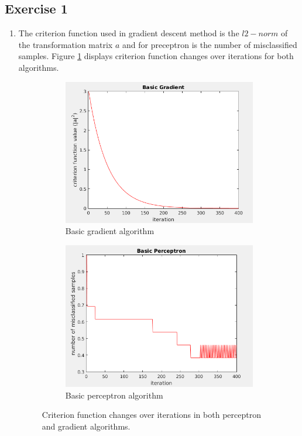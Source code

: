 \documentclass[12pt]{article}
\begin{document}
\subsection{Exercise 1}
\begin{enumerate}
\item The criterion function used in gradient descent method is the $l2-norm$ of the transformation matrix $a$ and for preceptron is the number of misclassified samples. Figure \ref{fig:ce1-1} displays criterion function changes over iterations for both algorithms.

\begin{figure}[h]
\centering 
\begin{subfigure}{0.4\textwidth}
	\includegraphics[scale=0.3]{Imgs/ce1-1.png}
	\caption{Basic gradient algorithm}
\end{subfigure}
\begin{subfigure}{0.4\textwidth}
	\includegraphics[scale=0.3]{Imgs/ce1-2.png}
	\caption{Basic perceptron algorithm}
\end{subfigure}
\caption{Criterion function changes over iterations in both perceptron and gradient algorithms.}
\label{fig:ce1-1}
\end{figure}


\end{enumerate}
\end{document}
